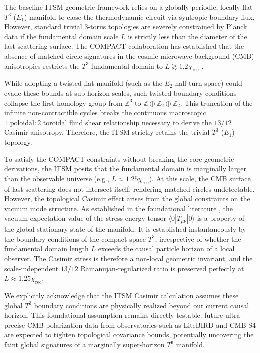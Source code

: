 \documentclass[aps,prd,10pt,twocolumn,superscriptaddress,nofootinbib,floatfix]{revtex4-2}
\begin{document}
The baseline ITSM geometric framework relies on a globally periodic, locally flat $T^{3}$ ($E_1$) manifold to close the thermodynamic circuit via syntropic boundary flux. However, standard trivial 3-torus topologies are severely constrained by Planck data if the fundamental domain scale $L$ is strictly less than the diameter of the last scattering surface. The COMPACT collaboration has established that the absence of matched-circle signatures in the cosmic microwave background (CMB) anisotropies restricts the $T^3$ fundamental domain to $L \gtrsim 1.2 \chi_{\text{rec}}$ \cite{compact_promise, compact_part4a}.

While adopting a twisted flat manifold (such as the $E_2$ half-turn space) could evade these bounds at sub-horizon scales, such twisted boundary conditions collapse the first homology group from $\mathbb{Z}^3$ to $\mathbb{Z} \oplus \mathbb{Z}_2 \oplus \mathbb{Z}_2$. This truncation of the infinite non-contractible cycles breaks the continuous macroscopic $1\text{ poloidal}: 2\text{ toroidal}$ fluid shear relationship necessary to derive the $13/12$ Casimir anisotropy. Therefore, the ITSM strictly retains the trivial $T^3$ ($E_1$) topology.

To satisfy the COMPACT constraints without breaking the core geometric derivations, the ITSM posits that the fundamental domain is marginally larger than the observable universe (e.g., $L \approx 1.25 \chi_{\text{rec}}$). At this scale, the CMB surface of last scattering does not intersect itself, rendering matched-circles undetectable. However, the topological Casimir effect arises from the global constraints on the vacuum mode structure. As established in the foundational literature \cite{birrell_davies_1982, lachieze_luminet_1995}, the vacuum expectation value of the stress-energy tensor $\langle 0 | T_{\mu\nu} | 0 \rangle$ is a property of the global stationary state of the manifold. It is established instantaneously by the boundary conditions of the compact space $T^3$, irrespective of whether the fundamental domain length $L$ exceeds the causal particle horizon of a local observer. The Casimir stress is therefore a non-local geometric invariant, and the scale-independent $13/12$ Ramanujan-regularized ratio is preserved perfectly at $L \approx 1.25 \chi_{\text{rec}}$.

We explicitly acknowledge that the ITSM Casimir calculation assumes these global $T^3$ boundary conditions are physically realized beyond our current causal horizon. This foundational assumption remains directly testable: future ultra-precise CMB polarization data from observatories such as LiteBIRD and CMB-S4 are expected to tighten topological covariance bounds, potentially uncovering the faint global signatures of a marginally super-horizon $T^3$ manifold.
\end{document}
